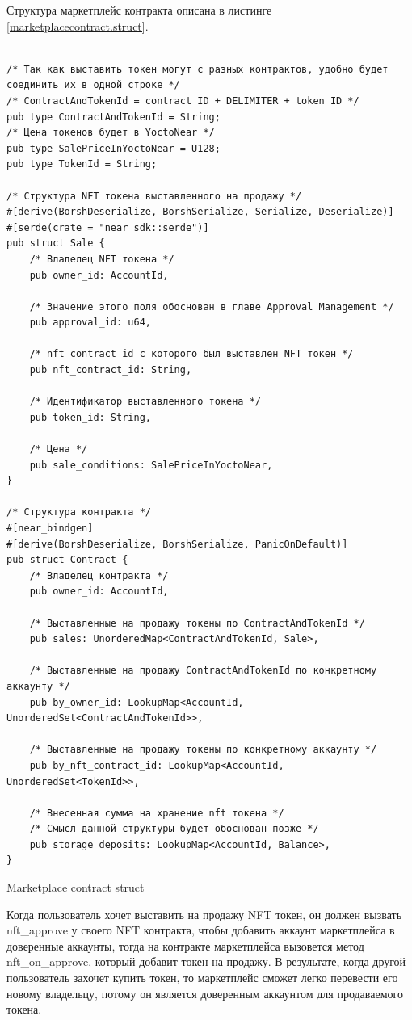 Структура маркетплейс контракта описана в листинге {\color{blue}\ref{marketplacecontract.struct}}.

\begin{listing}
\begin{verbatim}

/* Так как выставить токен могут с разных контрактов, удобно будет соединить их в одной строке */
/* ContractAndTokenId = contract ID + DELIMITER + token ID */
pub type ContractAndTokenId = String;
/* Цена токенов будет в YoctoNear */
pub type SalePriceInYoctoNear = U128;
pub type TokenId = String;

/* Структура NFT токена выставленного на продажу */
#[derive(BorshDeserialize, BorshSerialize, Serialize, Deserialize)]
#[serde(crate = "near_sdk::serde")]
pub struct Sale {
    /* Владелец NFT токена */
    pub owner_id: AccountId,

    /* Значение этого поля обоснован в главе Approval Management */
    pub approval_id: u64,

    /* nft_contract_id с которого был выставлен NFT токен */
    pub nft_contract_id: String,

    /* Идентификатор выставленного токена */
    pub token_id: String,

    /* Цена */
    pub sale_conditions: SalePriceInYoctoNear,
}

/* Структура контракта */
#[near_bindgen]
#[derive(BorshDeserialize, BorshSerialize, PanicOnDefault)]
pub struct Contract {
    /* Владелец контракта */
    pub owner_id: AccountId,

    /* Выставленные на продажу токены по ContractAndTokenId */
    pub sales: UnorderedMap<ContractAndTokenId, Sale>,

    /* Выставленные на продажу ContractAndTokenId по конкретному аккаунту */
    pub by_owner_id: LookupMap<AccountId, UnorderedSet<ContractAndTokenId>>,

    /* Выставленные на продажу токены по конкретному аккаунту */
    pub by_nft_contract_id: LookupMap<AccountId, UnorderedSet<TokenId>>,

    /* Внесенная сумма на хранение nft токена */
    /* Смысл данной структуры будет обоснован позже */
    pub storage_deposits: LookupMap<AccountId, Balance>,
}
\end{verbatim}
\caption{Marketplace contract struct}
\label{marketplacecontract.struct}
\end{listing}

Когда пользователь хочет выставить на продажу NFT токен, он должен вызвать nft\_approve у своего NFT контракта, чтобы добавить аккаунт маркетплейса в доверенные аккаунты, тогда на контракте маркетплейса вызовется метод nft\_on\_approve, который добавит токен на продажу.
В результате, когда другой пользователь захочет купить токен, то маркетплейс сможет легко перевести его новому владельцу, потому он является доверенным аккаунтом для продаваемого токена.


